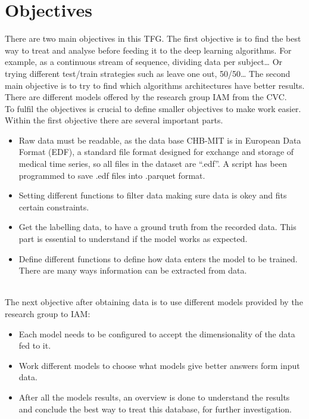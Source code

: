 ﻿\documentclass[10pt,a4paper,twocolumn,twoside]{article}
\begin{document}
\section{Objectives}
\label{sec-objectives}
There are two main objectives in this TFG. The first objective is to find the best way to treat and analyse before feeding it to the deep learning algorithms. For example, as a continuous stream of sequence, dividing data per subject…  Or trying different test/train strategies such as leave one out, 50/50… The second main objective is to try to find which algorithms architectures have better results. There are different models offered by the research group IAM from the CVC.
\\
To fulfil the objectives is crucial to define smaller objectives to make work easier. Within the first objective there are several important parts. 
\\
\begin{itemize}
  \item Raw data must be readable, as the data base CHB-MIT\cite{goldberger2000physiobank} is in European Data Format (EDF), a standard file format designed for exchange and storage of medical time series, so all files in the dataset are “.edf”. A script has been programmed to save .edf files into .parquet format.
  \item Setting different functions to filter data making sure data is okey and fits certain constraints. 
  \item Get the labelling data, to have a ground truth from the recorded data. This part is essential to understand if the model works as expected.
  \item Define different functions to define how data enters the model to be trained. There are many ways information can be extracted from data. 
\end{itemize}
\leavevmode\\
The next objective after obtaining data is to use different models provided by the research group to IAM:
\\
\begin{itemize}
  \item Each model needs to be configured to accept the dimensionality of the data fed to it.
  \item Work different models to choose what models give better answers form input data.
  \item After all the models results, an overview is done to understand the results and conclude the best way to treat this database, for further investigation.
\end{itemize}
\leavevmode\\
\end{document}
